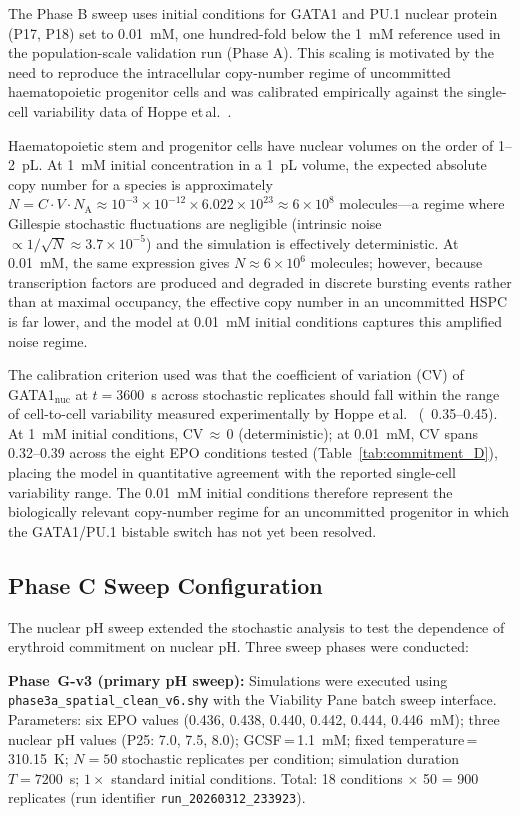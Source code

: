 The Phase B sweep uses initial conditions for GATA1 and PU.1 nuclear protein (P17, P18) set to 0.01~mM, one hundred-fold below the 1~mM reference used in the population-scale validation run (Phase A). This scaling is motivated by the need to reproduce the intracellular copy-number regime of uncommitted haematopoietic progenitor cells and was calibrated empirically against the single-cell variability data of Hoppe et\,al.~\cite{hoppe2016}.

Haematopoietic stem and progenitor cells have nuclear volumes on the order of 1–2~pL. At 1~mM initial concentration in a 1~pL volume, the expected absolute copy number for a species is approximately $N = C \cdot V \cdot N_{\mathrm{A}} \approx 10^{-3} \times 10^{-12} \times 6.022\times10^{23} \approx 6\times10^{8}$ molecules---a regime where Gillespie stochastic fluctuations are negligible (intrinsic noise $\propto 1/\sqrt{N} \approx 3.7\times10^{-5}$) and the simulation is effectively deterministic. At 0.01~mM, the same expression gives $N \approx 6\times10^{6}$ molecules; however, because transcription factors are produced and degraded in discrete bursting events rather than at maximal occupancy, the effective copy number in an uncommitted HSPC is far lower, and the model at 0.01~mM initial conditions captures this amplified noise regime.

The calibration criterion used was that the coefficient of variation (CV) of GATA1$_{\mathrm{nuc}}$ at $t = 3600$~s across stochastic replicates should fall within the range of cell-to-cell variability measured experimentally by Hoppe et\,al.~\cite{hoppe2016} (~0.35–0.45). At 1~mM initial conditions, CV\,$\approx$\,0 (deterministic); at 0.01~mM, CV spans 0.32–0.39 across the eight EPO conditions tested (Table~\ref{tab:commitment_D}), placing the model in quantitative agreement with the reported single-cell variability range. The 0.01~mM initial conditions therefore represent the biologically relevant copy-number regime for an uncommitted progenitor in which the GATA1/PU.1 bistable switch has not yet been resolved.

\subsection{Phase C Sweep Configuration}

The nuclear pH sweep extended the stochastic analysis to test the dependence of erythroid commitment on nuclear pH. Three sweep phases were conducted:

\textbf{Phase~G-v3 (primary pH sweep):} Simulations were executed using \texttt{phase3a\_spatial\_clean\_v6.shy} with the Viability Pane batch sweep interface. Parameters: six EPO values (0.436, 0.438, 0.440, 0.442, 0.444, 0.446~mM); three nuclear pH values (P25: 7.0, 7.5, 8.0); GCSF\,=\,1.1~mM; fixed temperature\,=\,310.15~K; $N=50$ stochastic replicates per condition; simulation duration $T=7200$~s; $1\times$ standard initial conditions. Total: 18 conditions $\times$ 50 = 900 replicates (run identifier \texttt{run\_20260312\_233923}).

